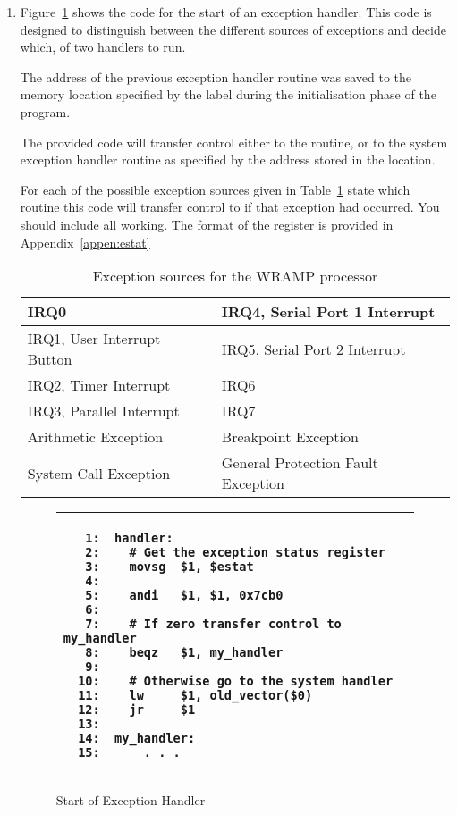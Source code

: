 \documentclass[a4paper,10pt]{article}
\begin{document}
\begin{enumerate}
\item Figure~\ref{code:handler} shows the code for the start of an
exception handler. This code is designed to distinguish between the
different sources of exceptions and decide which, of two handlers to
run.

The address of the previous exception handler routine was saved to the
memory location specified by the label  during
the initialisation phase of the program.

The provided code will transfer control either to the
 routine, or to the system exception handler
routine as specified by the address stored in the
 location.

For each of the possible exception sources given in
Table~\ref{table:esources} state which routine this code will transfer
control to if that exception had occurred. You should include all
working. The format of the  register is provided in
Appendix~\ref{appen:estat}


\begin{table}[h]
\begin{center}
\begin{tabular}{|l|l|}
\hline
IRQ0 & IRQ4, Serial Port 1 Interrupt \\
\hline
IRQ1, User Interrupt Button & IRQ5, Serial Port 2 Interrupt\\
\hline
IRQ2, Timer Interrupt & IRQ6 \\
\hline
IRQ3, Parallel Interrupt & IRQ7 \\
\hline
Arithmetic Exception & Breakpoint Exception \\
\hline
System Call Exception & General Protection Fault Exception \\
\hline
\end{tabular}
\end{center}
\caption{Exception sources for the WRAMP processor}
\label{table:esources}
\end{table}

\begin{figure}[h]
\begin{small}
\begin{center}
\begin{tabular}{|p{9cm}|}
\hline
\begin{verbatim}
   1:  handler:
   2:    # Get the exception status register
   3:    movsg  $1, $estat
   4:
   5:    andi   $1, $1, 0x7cb0
   6:
   7:    # If zero transfer control to my_handler
   8:    beqz   $1, my_handler
   9:
  10:    # Otherwise go to the system handler
  11:    lw     $1, old_vector($0)
  12:    jr     $1
  13:
  14:  my_handler:
  15:      . . . 	
\end{verbatim}
\\ \hline
\end{tabular}
\end{center}
\end{small}
\caption{Start of Exception Handler}
\label{code:handler}
\end{figure}
\end{enumerate}
\end{document}
